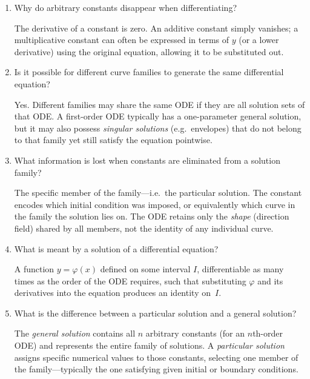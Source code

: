 \documentclass{self-check}
\begin{document}
\begin{enumerate}[leftmargin=*, itemsep=8pt]
  \item Why do arbitrary constants disappear when differentiating?

    \begin{answer} The derivative of a constant is zero.  An
      additive constant simply vanishes; a multiplicative constant can
      often be expressed in terms of $y$ (or a lower derivative) using
      the original equation, allowing it to be substituted out.
    \end{answer}

  \item Is it possible for different curve families to generate the
    same differential equation?

    \begin{answer} Yes.  Different families may share the same ODE
      if they are all solution sets of that ODE.  A first-order ODE
      typically has a one-parameter general solution, but it may also
      possess \emph{singular solutions} (e.g.\ envelopes) that do not
      belong to that family yet still satisfy the equation pointwise.
    \end{answer}

  \item What information is lost when constants are eliminated from a
    solution family?

    \begin{answer} The specific member of the family---i.e.\ the
      particular solution.  The constant encodes which initial
      condition was imposed, or equivalently which curve in the family
      the solution lies on.  The ODE retains only the \emph{shape}
      (direction field) shared by all members, not the identity of any
      individual curve.
    \end{answer}

  \item What is meant by a solution of a differential equation?

    \begin{answer} A function $y=\varphi(x)$ defined on some
      interval $I$, differentiable as many times as the order of the
      ODE requires, such that substituting $\varphi$ and its
      derivatives into the equation produces an identity on~$I$.
    \end{answer}

  \item What is the difference between a particular solution and a
    general solution?

    \begin{answer} The \emph{general solution} contains all $n$
      arbitrary constants (for an $n$th-order ODE) and represents the
      entire family of solutions.  A \emph{particular solution} assigns
      specific numerical values to those constants, selecting one
      member of the family---typically the one satisfying given initial
      or boundary conditions.
    \end{answer}


\end{enumerate}
\end{document}
